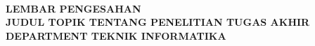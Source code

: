 \renewcommand{\headrulewidth}{3pt} 
\thispagestyle{fancy}

\hspace{-2cm}\\[1cm]
\begin{center}
{\bfseries LEMBAR PENGESAHAN}\\[1.0 cm]
{\bfseries JUDUL TOPIK TENTANG PENELITIAN TUGAS AKHIR DEPARTMENT TEKNIK INFORMATIKA} \\[0.5 cm]
\end{center}

\vspace{0.5cm}


